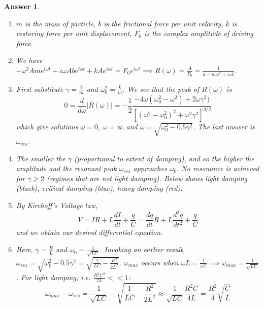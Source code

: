 \documentclass[a4paper]{article}
\newtheorem{ans}{Answer}[subsection]
\theoremstyle{new}
\begin{document}
\begin{ans}\leavevmode
\begin{enumerate}[label=(\roman*)]
\item $m$ is the mass of particle, $b$ is the frictional force per unit velocity, $k$ is restoring force per unit displacement, $F_0$ is the complex amplitude of driving force.
\item We have $-\omega^2Ame^{i\omega t}+i\omega Abe^{i\omega t}+kAe^{i\omega t}=F_0e^{i\omega t}\implies R(\omega)=\frac{A}{F_0}=\frac{1}{k-m\omega^2+i\omega b}$.
\item First substitute $\gamma=\frac{b}{m}$ and $\omega_0^2=\frac{k}{m}$. We see that the peak of $R(\omega)$ is
$$0=\frac{d}{d\omega}|R(\omega)|=-\frac{1}{2}\frac{-4\omega(\omega_0^2-\omega^2)+2\omega\gamma^2)}{[(\omega^2-\omega_0^2)^2+\omega^2\gamma^2]^{3/2}}$$
which give solutions $\omega=0$, $\omega=\infty$ and $\omega=\sqrt{\omega_0^2-0.5\gamma^2}$. The last answer is $\omega_{res}$.
\item  The smaller the $\gamma$ (proportional to extent of damping), and so the higher the amplitude and the resonant peak $\omega_{res}$ approaches $\omega_0$. No resonance is achieved for $\gamma\geq2$ (regimes that are not light damping). Below shows light damping (black), critical damping (blue), heavy damping (red).
\begin{center}
\end{center}
\item By Kirchoff's Voltage law,
$$V=IR+L\frac{dI}{dt}+\frac{q}{C}=\frac{dq}{dt}R+L\frac{d^2q}{dt^2}+\frac{q}{C}$$
and we obtain our desired differential equation.
\item Here, $\gamma=\frac{R}{L}$ and $\omega_0=\frac{1}{\sqrt{LC}}$. Invoking an earlier result, $\omega_{res}=\sqrt{\omega_0^2-0.5\gamma^2}=\sqrt{\frac{1}{LC}-\frac{R^2}{2L^2}}$. $\omega_{max}$ occurs when $\omega L=\frac{1}{\omega C}\implies\omega_{max}=\frac{1}{\sqrt{LC}}$. For light damping, i.e. $\frac{R^2C^2}{2L}<<1$:
$$\omega_{max}-\omega_{res}=\frac{1}{\sqrt{LC}}-\sqrt{\frac{1}{LC}-\frac{R^2}{2L^2}}\approx\frac{1}{\sqrt{LC}}\frac{R^2C}{4L}=\frac{R^2}{4}\sqrt{\frac{C}{L}}$$
\end{enumerate}
\end{ans}
\end{document}
